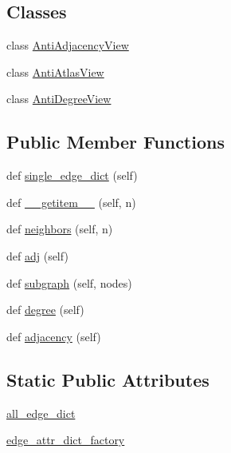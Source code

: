 \subsection*{Classes}
\begin{DoxyCompactItemize}
\item 
class \hyperlink{classnetworkx_1_1algorithms_1_1approximation_1_1kcomponents_1_1__AntiGraph_1_1AntiAdjacencyView}{Anti\+Adjacency\+View}
\item 
class \hyperlink{classnetworkx_1_1algorithms_1_1approximation_1_1kcomponents_1_1__AntiGraph_1_1AntiAtlasView}{Anti\+Atlas\+View}
\item 
class \hyperlink{classnetworkx_1_1algorithms_1_1approximation_1_1kcomponents_1_1__AntiGraph_1_1AntiDegreeView}{Anti\+Degree\+View}
\end{DoxyCompactItemize}
\subsection*{Public Member Functions}
\begin{DoxyCompactItemize}
\item 
def \hyperlink{classnetworkx_1_1algorithms_1_1approximation_1_1kcomponents_1_1__AntiGraph_a3987ff5d9b5e69cf304770ff85a11578}{single\+\_\+edge\+\_\+dict} (self)
\item 
def \hyperlink{classnetworkx_1_1algorithms_1_1approximation_1_1kcomponents_1_1__AntiGraph_af08acb13478a6ec8ffe23e64524428db}{\+\_\+\+\_\+getitem\+\_\+\+\_\+} (self, n)
\item 
def \hyperlink{classnetworkx_1_1algorithms_1_1approximation_1_1kcomponents_1_1__AntiGraph_ade3b9ac1f8c30de5887c6ada772143fd}{neighbors} (self, n)
\item 
def \hyperlink{classnetworkx_1_1algorithms_1_1approximation_1_1kcomponents_1_1__AntiGraph_a89cfd13c943f21def31558dbc5321ac1}{adj} (self)
\item 
def \hyperlink{classnetworkx_1_1algorithms_1_1approximation_1_1kcomponents_1_1__AntiGraph_a2b7abffa8b3c87e5ab14e1a705f3171c}{subgraph} (self, nodes)
\item 
def \hyperlink{classnetworkx_1_1algorithms_1_1approximation_1_1kcomponents_1_1__AntiGraph_ac8f0731c9eb95e35863a7ff414f5b37c}{degree} (self)
\item 
def \hyperlink{classnetworkx_1_1algorithms_1_1approximation_1_1kcomponents_1_1__AntiGraph_a850304106c02025d21d1cb29b26008e6}{adjacency} (self)
\end{DoxyCompactItemize}
\subsection*{Static Public Attributes}
\begin{DoxyCompactItemize}
\item 
\hyperlink{classnetworkx_1_1algorithms_1_1approximation_1_1kcomponents_1_1__AntiGraph_a0ed6f4ff5beeafa92463ce170855d13b}{all\+\_\+edge\+\_\+dict}
\item 
\hyperlink{classnetworkx_1_1algorithms_1_1approximation_1_1kcomponents_1_1__AntiGraph_affb72b3a7a68234d37d74f2dccbef604}{edge\+\_\+attr\+\_\+dict\+\_\+factory}
\end{DoxyCompactItemize}


